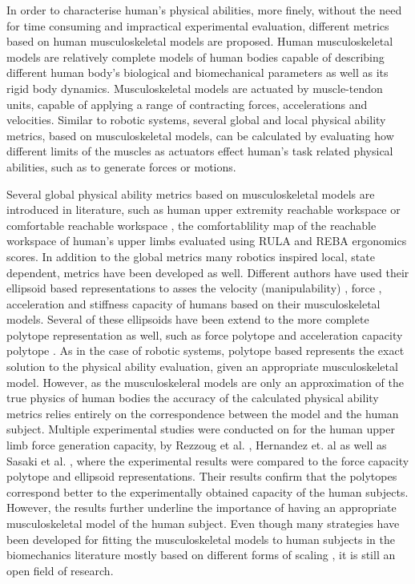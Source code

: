 In order to characterise human's physical abilities, more finely, without the need for time consuming and impractical experimental evaluation, different metrics based on human musculoskeletal models are proposed. Human musculoskeletal models are relatively complete models of human bodies capable of describing different human body's biological and biomechanical parameters as well as its rigid body dynamics. Musculoskeletal models are actuated by muscle-tendon units, capable of applying a range of contracting forces, accelerations and velocities. Similar to robotic systems, several global and local physical ability metrics, based on musculoskeletal models, can be calculated by evaluating how different limits of the muscles as actuators effect human's task related physical abilities, such as to generate forces or motions. 

Several global physical ability metrics based on musculoskeletal models are introduced in literature, such as human upper extremity reachable workspace \cite{Lenarcic1994,Kurillo2013} or comfortable reachable workspace \cite{Figueredo2021}, the comfortablility map of the reachable workspace of human's upper limbs evaluated using RULA and REBA ergonomics scores. In addition to the global metrics many robotics inspired local, state dependent, metrics have been developed as well. Different authors have used their ellipsoid based representations to asses the velocity (manipulability) \cite{Rezzoug2012manipulability}, force \cite{rezzoug_application_2012, lazinica_higher_2010}, acceleration \cite{khatib2009robotics} and stiffness \cite{Artemiadis2010} capacity of humans based on their musculoskeletal models. Several of these ellipsoids have been extend to the more complete polytope representation as well, such as force polytope \cite{sasaki2011vertex, rezzoug_application_2012, carmichael_estimating_2013} and acceleration capacity polytope \cite{khatib2009robotics, demircan2012muscle}. As in the case of robotic systems, polytope based represents the exact solution to the physical ability evaluation, given an appropriate musculoskeletal model. However, as the musculoskeleral models are only an approximation of the true physics of human bodies the accuracy of the calculated physical ability metrics relies entirely on the correspondence between the model and the human subject. Multiple experimental studies were conducted on for the human upper limb force generation capacity, by Rezzoug et al. \cite{biomechanics1010008}, Hernandez et. al \cite{HERNANDEZ2015} as well as Sasaki et al. \cite{lazinica_higher_2010}, where the experimental results were compared to the force capacity polytope and ellipsoid representations. Their results confirm that the polytopes correspond better to the experimentally obtained capacity of the human subjects. However, the results further underline the importance of having an appropriate musculoskeletal model of the human subject. Even though many strategies have been developed for fitting the musculoskeletal models to human subjects in the biomechanics literature mostly based on different forms of scaling \cite{Lund2015, Ziyun2019}, it is still an open field of research. 

